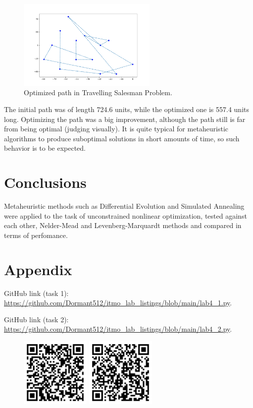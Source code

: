 \documentclass[12pt, a4paper]{article}
\begin{document}
\begin{figure}[!h]
\centering
\includegraphics[width=0.6\textwidth]{pic3.png}
\caption{Optimized path in Travelling Salesman Problem.}
\end{figure}

The initial path was of length 724.6 units, while the optimized one is 557.4 units long. Optimizing the path was a big improvement, although the path still is far from being optimal (judging visually). It is quite typical for metaheuristic algorithms to produce suboptimal solutions in short amounts of time, so such behavior is to be expected.

\section*{Conclusions}

Metaheuristic methods such as Differential Evolution and Simulated Annealing were applied to the task of unconstrained nonlinear optimization, tested against each other, Nelder-Mead and Levenberg-Marquardt methods and compared in terms of perfomance.

\newpage

\section*{Appendix}

GitHub link (task 1): \url{https://github.com/Dormant512/itmo_lab_listings/blob/main/lab4_1.py}.

GitHub link (task 2): \url{https://github.com/Dormant512/itmo_lab_listings/blob/main/lab4_2.py}.

\begin{figure}[!h]
\centering
\includegraphics[width=0.3\textwidth]{lab4-1.png}
\includegraphics[width=0.3\textwidth]{lab4-2.png}
\end{figure}
\end{document}
